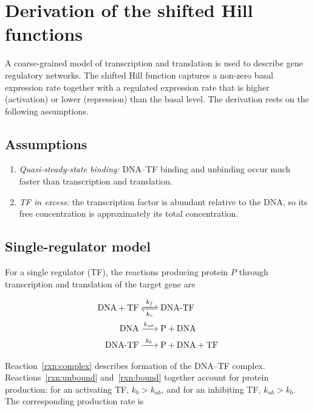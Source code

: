 \documentclass[11pt]{article}
\newcommand{\beginsupplement}{%
        \setcounter{table}{0}
        \renewcommand{\thetable}{S\arabic{table}}%
        \setcounter{figure}{0}
        \renewcommand{\thefigure}{S\arabic{figure}}%
        \setcounter{section}{0}
        \renewcommand{\thesection}{S\arabic{section}}%
     }
\begin{document}
\printbibliography

\beginsupplement

 \newpage \section{Derivation of the shifted Hill functions}

A coarse-grained model of transcription and translation is used to describe gene
regulatory networks. The shifted Hill function captures a non-zero basal
expression rate together with a regulated expression rate that is higher
(activation) or lower (repression) than the basal level. The derivation rests on
the following assumptions.

\subsection{Assumptions}

\begin{enumerate}
    \item \emph{Quasi-steady-state binding:} DNA--TF binding and unbinding occur
    much faster than transcription and translation.
    \item \emph{TF in excess:} the transcription factor is abundant relative to
    the DNA, so its free concentration is approximately its total concentration.
\end{enumerate}

\subsection{Single-regulator model}

For a single regulator (TF), the reactions producing protein $P$ through
transcription and translation of the target gene are

\begin{align}
    \ce{DNA + TF &<=>[$k_f$][$k_r$] DNA{-}TF} \label{rxn:complex} \\
    \ce{DNA &->[$k_{ub}$] P + DNA} \label{rxn:unbound} \\
    \ce{DNA{-}TF &->[$k_{b}$] P + DNA + TF} \label{rxn:bound}
\end{align}

Reaction~\eqref{rxn:complex} describes formation of the DNA--TF complex.
Reactions~\eqref{rxn:unbound} and~\eqref{rxn:bound} together account for protein
production: for an activating TF, $k_b > k_{ub}$, and for an inhibiting TF,
$k_{ub} > k_b$. The corresponding production rate is
\end{document}
